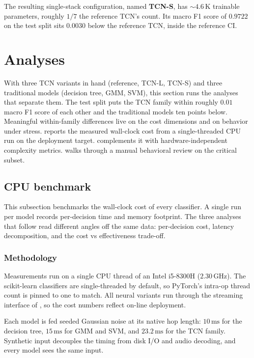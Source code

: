 \bigskip

The resulting single-stack configuration, named \textbf{TCN-S}, has $\sim 4.6$\,K trainable parameters, roughly $1/7$ the reference TCN's count.
Its macro F1 score of $0.9722$ on the test split sits $0.0030$ below the reference TCN, inside the reference CI.

\section{Analyses}
\label{sec:exp_analyses}

With three TCN variants in hand (reference, TCN-L, TCN-S) and three traditional models (decision tree, GMM, SVM), this section runs the analyses that separate them.
The test split puts the TCN family within roughly $0.01$ macro F1 score of each other and the traditional models ten points below.
Meaningful within-family differences live on the cost dimensions and on behavior under stress.
 reports the measured wall-clock cost from a single-threaded CPU run on the deployment target.
 complements it with hardware-independent complexity metrics.
 walks through a manual behavioral review on the critical subset.

\subsection{CPU benchmark}
\label{subsec:exp_complexity_results}

This subsection benchmarks the wall-clock cost of every classifier.
A single run per model records per-decision time and memory footprint.
The three analyses that follow read different angles off the same data: per-decision cost, latency decomposition, and the cost vs effectiveness trade-off.

\subsubsection{Methodology}

Measurements run on a single CPU thread of an Intel i5-8300H ($2.30\,\text{GHz}$).
The scikit-learn classifiers are single-threaded by default, so PyTorch's intra-op thread count is pinned to one to match.
All neural variants run through the streaming interface of , so the cost numbers reflect on-line deployment.

Each model is fed seeded Gaussian noise at its native hop length: $10\,\text{ms}$ for the decision tree, $15\,\text{ms}$ for GMM and SVM, and $23.2\,\text{ms}$ for the TCN family.
Synthetic input decouples the timing from disk I/O and audio decoding, and every model sees the same input.

